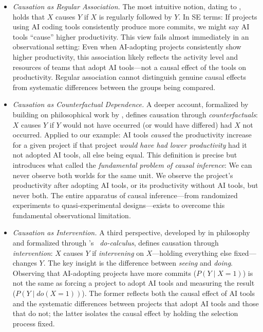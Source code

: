 \begin{itemize}[leftmargin=15pt]
    \item \emph{Causation as Regular Association.} 
    The most intuitive notion, dating to \citet{hume1748enquiry}, holds that $X$ causes $Y$ if $X$ is regularly followed by $Y$.
    In SE terms: If projects using AI coding tools consistently produce more commits, we might say AI tools ``cause'' higher productivity.
    This view fails almost immediately in an observational setting: Even when AI-adopting projects consistently show higher productivity, this association likely reflects the activity level and resources of teams that adopt AI tools---not a causal effect of the tools on productivity.
    Regular association cannot distinguish genuine causal effects from systematic differences between the groups being compared.  
    \item \emph{Causation as Counterfactual Dependence.} 
    A deeper account, formalized by \citet{rubin1974estimating} building on philosophical work by \citet{lewis1973causation}, defines causation through \emph{counterfactuals}: $X$ causes $Y$ if $Y$ would not have occurred (or would have differed) had $X$ not occurred.
    Applied to our example: AI tools \emph{caused} the productivity increase for a given project if that project \emph{would have had lower productivity} had it not adopted AI tools, all else being equal.
    This definition is precise but introduces what \citet{holland1986statistics} called the \emph{fundamental problem of causal inference}: We can never observe both worlds for the same unit.
    We observe the project's productivity after adopting AI tools, or its productivity without AI tools, but never both.
    The entire apparatus of causal inference---from randomized experiments to quasi-experimental designs---exists to overcome this fundamental observational limitation.
    \item \emph{Causation as Intervention.} 
    A third perspective, developed by \citet{woodward2003making} in philosophy and formalized through \citeauthor{pearl2009causality}'s~\cite{pearl2009causality} \emph{do-calculus}, defines causation through \emph{intervention}: $X$ causes $Y$ if \emph{intervening} on $X$---holding everything else fixed---changes $Y$.
    The key insight is the difference between \emph{seeing} and \emph{doing}.
    Observing that AI-adopting projects have more commits ($P(Y \mid X\!=\!1)$) is not the same as forcing a project to adopt AI tools and measuring the result ($P(Y \mid do(X\!=\!1))$).
    The former reflects both the causal effect of AI tools and the systematic differences between projects that adopt AI tools and those that do not; the latter isolates the causal effect by holding the selection process fixed.

\end{itemize}
